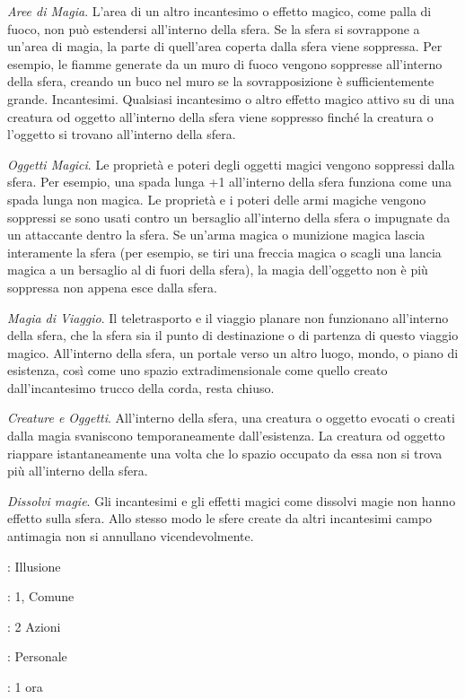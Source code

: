 \begin{multicols}{2}
\emph{Aree di Magia}. L'area di un altro incantesimo o effetto magico, come palla di fuoco, non può estendersi all'interno della sfera. Se la sfera si sovrappone a un'area di magia, la parte di quell'area coperta dalla sfera viene soppressa. Per esempio, le fiamme generate da un muro di fuoco vengono soppresse all'interno della sfera, creando un buco nel muro se la sovrapposizione è sufficientemente grande. Incantesimi. Qualsiasi incantesimo o altro effetto magico attivo su di una creatura od oggetto all'interno della sfera viene soppresso finché la creatura o l'oggetto si trovano all'interno della sfera.

\emph{Oggetti Magici}. Le proprietà e poteri degli oggetti magici vengono soppressi dalla sfera. Per esempio, una spada lunga +1 all'interno della sfera funziona come una spada lunga non magica. Le proprietà e i poteri delle armi magiche vengono soppressi se sono usati contro un bersaglio all'interno della sfera o impugnate da un attaccante dentro la sfera. Se un'arma magica o munizione magica lascia interamente la sfera (per esempio, se tiri una freccia magica o scagli una lancia magica a un bersaglio al di fuori della sfera), la magia dell'oggetto non è più soppressa non appena esce dalla sfera.

\emph{Magia di Viaggio}. Il teletrasporto e il viaggio planare non funzionano all'interno della sfera, che la sfera sia il punto di destinazione o di partenza di questo viaggio magico. All'interno della sfera, un portale verso un altro luogo, mondo, o piano di esistenza, così come uno spazio extradimensionale come quello creato dall'incantesimo trucco della corda, resta chiuso.

\emph{Creature e Oggetti}. All'interno della sfera, una creatura o oggetto evocati o creati dalla magia svaniscono temporaneamente dall'esistenza. La creatura od oggetto riappare istantaneamente una volta che lo spazio occupato da essa non si trova più all'interno della sfera.

\emph{Dissolvi magie}. Gli incantesimi e gli effetti magici come dissolvi magie non hanno effetto sulla sfera. Allo stesso modo le sfere create da altri incantesimi campo antimagia non si annullano vicendevolmente.

\noindent\colorbox{OBSSgold!10}{
\begin{minipage}{0.95\linewidth}
\begin{description}[noitemsep, topsep=0pt, parsep=0pt, partopsep=0pt, leftmargin=0cm, labelwidth=1.3cm]
	\item[\textbf{Lista}]: Illusione
	\item[\textbf{Livello}]: 1, Comune
	\item[\textbf{Lancio}]: 2 Azioni
	\item[\textbf{Gittata}]: Personale
	\item[\textbf{Durata}]: 1 ora
\end{description}
\end{minipage}}\smallskip


\end{multicols}
